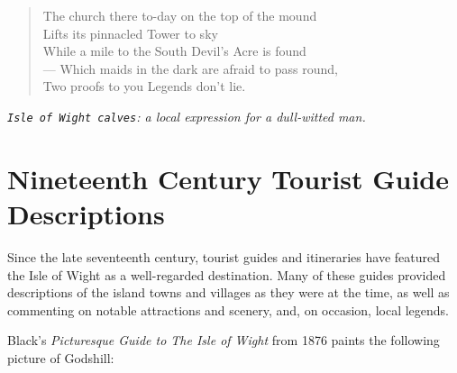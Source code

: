 \documentclass[
  12pt,
  a5paper,
  twoside]{book}
\let\oldtexttt\texttt        %
\renewcommand{\texttt}[1]{{\footnotesize\oldtexttt{#1}}}
\begin{document}
\begin{quote}
The church there to-day on the top of the mound\\
Lifts its pinnacled Tower to sky\\
While a mile to the South Devil's Acre is found\\
--- Which maids in the dark are afraid to pass round,\\
Two proofs to you Legends don't lie.
\end{quote}

\emph{\texttt{Isle\ of\ Wight\ calves}: a local expression for a
dull-witted man.}


\chapter{Nineteenth Century Tourist Guide
Descriptions}\label{nineteenth-century-tourist-guide-descriptions}

Since the late seventeenth century, tourist guides and itineraries have
featured the Isle of Wight as a well-regarded destination. Many of these
guides provided descriptions of the island towns and villages as they
were at the time, as well as commenting on notable attractions and
scenery, and, on occasion, local legends.

Black's \emph{Picturesque Guide to The Isle of Wight} from 1876 paints
the following picture of Godshill:
\end{document}
